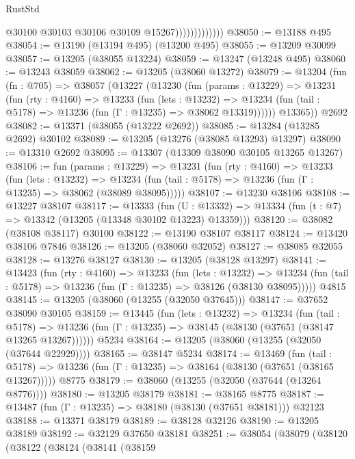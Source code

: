 \begin{lexlean}{RustStd}
\begin{coremodule}
                              @30100
                              @30103
                              @30106
                              @30109
                              @15267)))))))))))))
@38050 := @13188 @495
@38054 := @13190 (@13194 @495) (@13200 @495)
@38055 := @13209 @30099
@38057 := @13205 (@38055 @13224)
@38059 := @13247 (@13248 @495)
@38060 := @13243 @38059
@38062 := @13205 (@38060 @13272)
@38079 := @13204
    (fun (fn : @705) =>
    @38057
      (@13227
        (@13230
          (fun (params : @13229) =>
          @13231
            (fun (rty : @4160) =>
            @13233
              (fun (lets : @13232) =>
              @13234 (fun (tail : @5178) => @13236 (fun (Γ : @13235) => @38062 @13319))))))
        @13365))
    @2692
@38082 := @13371 (@38055 (@13222 @2692))
@38085 := @13284 (@13285 @2692) @30102
@38089 := @13205 (@13276 (@38085 @13293) @13297)
@38090 := @13310 @2692
@38095 := @13307 (@13309 @38090 @30105 @13265 @13267)
@38106 := fun (params : @13229) =>
  @13231
    (fun (rty : @4160) =>
    @13233
      (fun (lets : @13232) =>
      @13234 (fun (tail : @5178) => @13236 (fun (Γ : @13235) => @38062 (@38089 @38095)))))
@38107 := @13230 @38106
@38108 := @13227 @38107
@38117 := @13333
    (fun (U : @13332) => @13334 (fun (t : @7) => @13342 (@13205 (@13348 @30102 @13223) @13359)))
@38120 := @38082 (@38108 @38117) @30100
@38122 := @13190 @38107 @38117
@38124 := @13420 @38106 @7846
@38126 := @13205 (@38060 @32052)
@38127 := @38085 @32055
@38128 := @13276 @38127
@38130 := @13205 (@38128 @13297)
@38141 := @13423
    (fun (rty : @4160) =>
    @13233
      (fun (lets : @13232) =>
      @13234 (fun (tail : @5178) => @13236 (fun (Γ : @13235) => @38126 (@38130 @38095)))))
    @4815
@38145 := @13205 (@38060 (@13255 (@32050 @37645)))
@38147 := @37652 @38090 @30105
@38159 := @13445
    (fun (lets : @13232) =>
    @13234
      (fun (tail : @5178) =>
      @13236 (fun (Γ : @13235) => @38145 (@38130 (@37651 (@38147 @13265 @13267))))))
    @5234
@38164 := @13205 (@38060 (@13255 (@32050 (@37644 @22929))))
@38165 := @38147 @5234
@38174 := @13469
    (fun (tail : @5178) => @13236 (fun (Γ : @13235) => @38164 (@38130 (@37651 (@38165 @13267)))))
    @8775
@38179 := @38060 (@13255 (@32050 (@37644 (@13264 @8776))))
@38180 := @13205 @38179
@38181 := @38165 @8775
@38187 := @13487 (fun (Γ : @13235) => @38180 (@38130 (@37651 @38181))) @32123
@38188 := @13371 @38179
@38189 := @38128 @32126
@38190 := @13205 @38189
@38192 := @32129 @37650 @38181
@38251 := @38054
    (@38079
      (@38120
        (@38122
          (@38124
            (@38141
              (@38159

\end{coremodule}
\end{lexlean}
